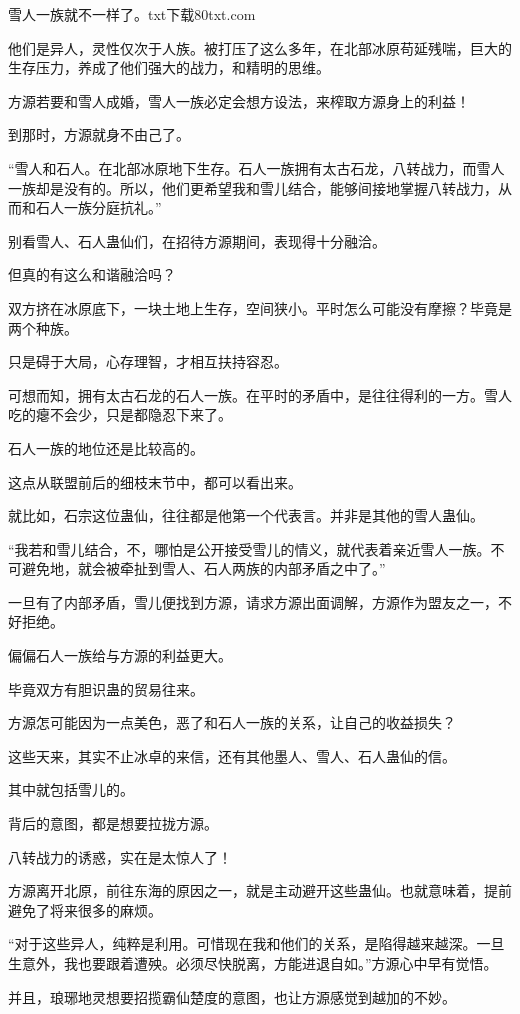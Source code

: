 \begin{this_body}
雪人一族就不一样了。txt下载80txt.com

他们是异人，灵性仅次于人族。被打压了这么多年，在北部冰原苟延残喘，巨大的生存压力，养成了他们强大的战力，和精明的思维。

方源若要和雪人成婚，雪人一族必定会想方设法，来榨取方源身上的利益！

到那时，方源就身不由己了。

“雪人和石人。在北部冰原地下生存。石人一族拥有太古石龙，八转战力，而雪人一族却是没有的。所以，他们更希望我和雪儿结合，能够间接地掌握八转战力，从而和石人一族分庭抗礼。”

别看雪人、石人蛊仙们，在招待方源期间，表现得十分融洽。

但真的有这么和谐融洽吗？

双方挤在冰原底下，一块土地上生存，空间狭小。平时怎么可能没有摩擦？毕竟是两个种族。

只是碍于大局，心存理智，才相互扶持容忍。

可想而知，拥有太古石龙的石人一族。在平时的矛盾中，是往往得利的一方。雪人吃的瘪不会少，只是都隐忍下来了。

石人一族的地位还是比较高的。

这点从联盟前后的细枝末节中，都可以看出来。

就比如，石宗这位蛊仙，往往都是他第一个代表言。并非是其他的雪人蛊仙。

“我若和雪儿结合，不，哪怕是公开接受雪儿的情义，就代表着亲近雪人一族。不可避免地，就会被牵扯到雪人、石人两族的内部矛盾之中了。”

一旦有了内部矛盾，雪儿便找到方源，请求方源出面调解，方源作为盟友之一，不好拒绝。

偏偏石人一族给与方源的利益更大。

毕竟双方有胆识蛊的贸易往来。

方源怎可能因为一点美色，恶了和石人一族的关系，让自己的收益损失？

这些天来，其实不止冰卓的来信，还有其他墨人、雪人、石人蛊仙的信。

其中就包括雪儿的。

背后的意图，都是想要拉拢方源。

八转战力的诱惑，实在是太惊人了！

方源离开北原，前往东海的原因之一，就是主动避开这些蛊仙。也就意味着，提前避免了将来很多的麻烦。

“对于这些异人，纯粹是利用。可惜现在我和他们的关系，是陷得越来越深。一旦生意外，我也要跟着遭殃。必须尽快脱离，方能进退自如。”方源心中早有觉悟。

并且，琅琊地灵想要招揽霸仙楚度的意图，也让方源感觉到越加的不妙。


\end{this_body}
